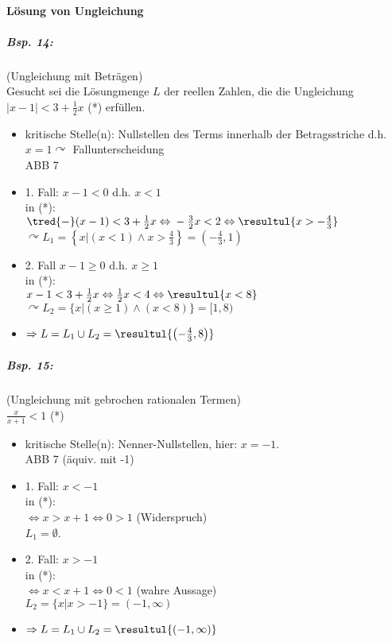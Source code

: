 \paragraph{Lösung von Ungleichung}
\subparagraph{Bsp. 14:} (Ungleichung mit Beträgen)\\
Gesucht sei die Lösungmenge $L$ der reellen Zahlen, die die Ungleichung $|x-1|<3+\frac{1}{2}x$ (*) erfüllen.
\begin{itemize}
\item kritische Stelle(n): Nullstellen des Terms innerhalb der Betragsstriche d.h. $x=1 \curvearrowright$ Fallunterscheidung\\
ABB 7
\item 1. Fall: $x-1<0$ d.h. $x<1$\\
in (*): \\
$\tred{-}(x-1)<3+\frac{1}{2}x \Leftrightarrow \\
-\frac{3}{2}x<2 \Leftrightarrow \\
\resultul{x>-\frac{4}{3}}$\\
$\curvearrowright L_1=\left\lbrace x|(x<1) \wedge x>\frac{4}{3}\right\rbrace = \left(-\frac{4}{3},1\right)$
\item 2. Fall $x-1 \geq 0$ d.h. $x\geq 1$\\
in (*):\\
$x-1< 3+ \frac{1}{2}x \Leftrightarrow\\
\frac{1}{2}x<4 \Leftrightarrow\\
\resultul{x<8}$\\
$\curvearrowright L_2 = \{ x| (x\geq 1) \wedge (x <8)\}=[1,8)$
\item $\Rightarrow L = L_1 \cup L_2 = \resultul{\left(-\frac{4}{3},8\right)}$
\end{itemize}
\subparagraph{Bsp. 15:} (Ungleichung mit gebrochen rationalen Termen)\\
$\frac{x}{x+1}<1$ (*)
\begin{itemize}
\item kritische Stelle(n): Nenner-Nullstellen, hier: $x=-1$.\\
ABB 7 (äquiv. mit -1)
\item 1. Fall: $x<-1$\\
in (*):\\
$\Leftrightarrow x>x+1 \Leftrightarrow 0>1$ (Widerspruch)\\
$L_1=\emptyset$.
\item 2. Fall: $x > -1$\\
in (*):\\
$\Leftrightarrow x < x+1 \Leftrightarrow 0<1$ (wahre Aussage)\\
$L_2=\{x|x>-1\}=(-1,\infty)$
\item $\Rightarrow L = L_1 \cup L_2 = \resultul{(-1,\infty)}$
\end{itemize}

